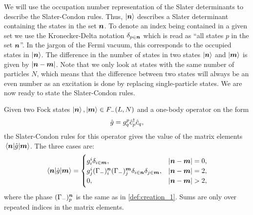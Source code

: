             We will use the occupation number representation of the Slater
            determinants to describe the Slater-Condon rules.
            Thus, $\ket{\boldsymbol{n}}$ describes a Slater determinant containing the
            states in the set $\boldsymbol{n}$.
            To denote an index being contained in a given set we use the
            Kronecker-Delta notation $\delta_{p \in \boldsymbol{n}}$ which is read as
            ``all states $p$ in the set $\boldsymbol{n}$''.
            In the jargon of the Fermi vacuum, this corresponds to the occupied
            states in $\ket{\boldsymbol{n}}$.
            The difference in the number of states in two states $\ket{\boldsymbol{n}}$
            and $\ket{\boldsymbol{m}}$ is given by $\abs{\boldsymbol{n} - \boldsymbol{m}}$.
            Note that we only look at states with the same number of particles
            $N$, which means that the difference between two states will always
            be an even number as an excitation is done by replacing
            single-particle states.
            We are now ready to state the Slater-Condon rules.
            \begin{lemma}
                \label{lemma:slater-condon-one-body}
                Given two Fock states $\ket{\boldsymbol{n}}, \ket{\boldsymbol{m}} \in F_{-}(L,
                N)$ and a one-body operator on the form
                \begin{align}
                    \hat{g} = g^{p}_{q}\hat{c}_{p}^{\dagger}\hat{c}_{q},
                \end{align}
                the Slater-Condon rules for this operator gives the value of the
                matrix elements $\mel{\boldsymbol{n}}{\hat{g}}{\boldsymbol{m}}$.
                The three cases are:
                \begin{gather}
                    \mel{\boldsymbol{n}}{\hat{g}}{\boldsymbol{m}}
                    = \begin{cases}
                        g^{i}_{i}\delta_{i \in \boldsymbol{m}},
                        & \abs{\boldsymbol{n} - \boldsymbol{m}} = 0,
                        \\
                        g^{i}_{j}
                        (\Gamma_{-})^{\boldsymbol{n}}_{i}
                        (\Gamma_{-})^{\boldsymbol{m}}_{j}
                        \delta_{i \in \boldsymbol{n}}
                        \delta_{j \in \boldsymbol{m}},
                        & \abs{\boldsymbol{n} - \boldsymbol{m}} = 2,
                        \\
                        0, & \abs{\boldsymbol{n} - \boldsymbol{m}} > 2,
                    \end{cases}
                \end{gather}
                where the phase $(\Gamma_{-})^{\boldsymbol{n}}_{p}$ is the same as in
                \autoref{def:creation_1}.
                Sums are only over repeated indices in the matrix elements.
            \end{lemma}
